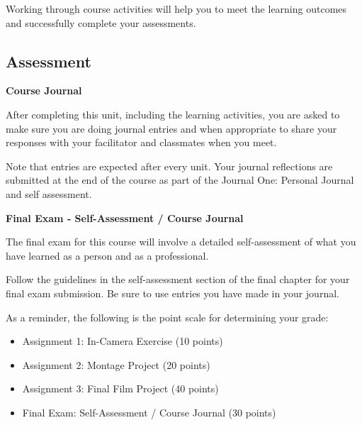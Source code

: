 \documentclass[
  letterpaper,
  DIV=11,
  numbers=noendperiod]{scrreprt}
\providecommand{\tightlist}{%
  \setlength{\itemsep}{0pt}\setlength{\parskip}{0pt}}\usepackage{longtable,booktabs,array}
\begin{document}
\begin{tcolorbox}[enhanced jigsaw, toprule=.15mm, colframe=quarto-callout-note-color-frame, colback=white, arc=.35mm, left=2mm, rightrule=.15mm, bottomrule=.15mm, opacityback=0, breakable, leftrule=.75mm]
\begin{minipage}[t]{5.5mm}
\textcolor{quarto-callout-note-color}{\faInfo}
\end{minipage}%
\begin{minipage}[t]{\textwidth - 5.5mm}

Working through course activities will help you to meet the learning
outcomes and successfully complete your assessments.

\end{minipage}%
\end{tcolorbox}

\subsection*{Assessment}\label{assessment-9}

\textbf{Course Journal}

After completing this unit, including the learning activities, you are
asked to make sure you are doing journal entries and when appropriate to
share your responses with your facilitator and classmates when you meet.

Note that entries are expected after every unit. Your journal
reflections are submitted at the end of the course as part of the
Journal One: Personal Journal and self assessment.

\textbf{Final Exam - Self-Assessment / Course Journal}

The final exam for this course will involve a detailed self-assessment
of what you have learned as a person and as a professional.

Follow the guidelines in the self-assessment section of the final
chapter for your final exam submission. Be sure to use entries you have
made in your journal.

As a reminder, the following is the point scale for determining your
grade:

\begin{itemize}
\tightlist
\item
  Assignment 1: In-Camera Exercise (10 points)
\item
  Assignment 2: Montage Project (20 points)
\item
  Assignment 3: Final Film Project (40 points)
\item
  Final Exam: Self-Assessment / Course Journal (30 points)
\end{itemize}
\end{document}
